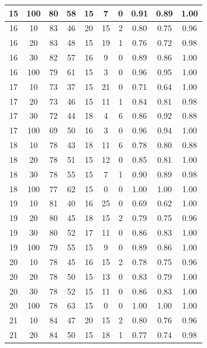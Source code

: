 \begin{longtable}{ |c|c|c|c|c|c|c|c|c|c| }
            15 & 100 & 80 & 58 & 15 & 7 & 0 & 0.91 & 0.89 & 1.00 \\ \hline
            16 & 10 & 83 & 46 & 20 & 15 & 2 & 0.80 & 0.75 & 0.96 \\ \hline
            16 & 20 & 83 & 48 & 15 & 19 & 1 & 0.76 & 0.72 & 0.98 \\ \hline
            16 & 30 & 82 & 57 & 16 & 9 & 0 & 0.89 & 0.86 & 1.00 \\ \hline
            16 & 100 & 79 & 61 & 15 & 3 & 0 & 0.96 & 0.95 & 1.00 \\ \hline
            17 & 10 & 73 & 37 & 15 & 21 & 0 & 0.71 & 0.64 & 1.00 \\ \hline
            17 & 20 & 73 & 46 & 15 & 11 & 1 & 0.84 & 0.81 & 0.98 \\ \hline
            17 & 30 & 72 & 44 & 18 & 4 & 6 & 0.86 & 0.92 & 0.88 \\ \hline
            17 & 100 & 69 & 50 & 16 & 3 & 0 & 0.96 & 0.94 & 1.00 \\ \hline
            18 & 10 & 78 & 43 & 18 & 11 & 6 & 0.78 & 0.80 & 0.88 \\ \hline
            18 & 20 & 78 & 51 & 15 & 12 & 0 & 0.85 & 0.81 & 1.00 \\ \hline
            18 & 30 & 78 & 55 & 15 & 7 & 1 & 0.90 & 0.89 & 0.98 \\ \hline
            18 & 100 & 77 & 62 & 15 & 0 & 0 & 1.00 & 1.00 & 1.00 \\ \hline
            19 & 10 & 81 & 40 & 16 & 25 & 0 & 0.69 & 0.62 & 1.00 \\ \hline
            19 & 20 & 80 & 45 & 18 & 15 & 2 & 0.79 & 0.75 & 0.96 \\ \hline
            19 & 30 & 80 & 52 & 17 & 11 & 0 & 0.86 & 0.83 & 1.00 \\ \hline
            19 & 100 & 79 & 55 & 15 & 9 & 0 & 0.89 & 0.86 & 1.00 \\ \hline
            20 & 10 & 78 & 45 & 16 & 15 & 2 & 0.78 & 0.75 & 0.96 \\ \hline
            20 & 20 & 78 & 50 & 15 & 13 & 0 & 0.83 & 0.79 & 1.00 \\ \hline
            20 & 30 & 78 & 52 & 15 & 11 & 0 & 0.86 & 0.83 & 1.00 \\ \hline
            20 & 100 & 78 & 63 & 15 & 0 & 0 & 1.00 & 1.00 & 1.00 \\ \hline
            21 & 10 & 84 & 47 & 20 & 15 & 2 & 0.80 & 0.76 & 0.96 \\ \hline
            21 & 20 & 84 & 50 & 15 & 18 & 1 & 0.77 & 0.74 & 0.98 \\ \hline

\end{longtable}
